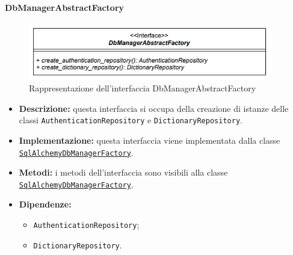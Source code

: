 \paragraph{DbManagerAbstractFactory} \label{DbManagerAbstractFactory}
\begin{figure}[H]
    \centering
    \includegraphics[width=0.95\textwidth]{assets/Backend/db_manager_abstract_factory.png}
    \caption{Rappresentazione dell'interfaccia DbManagerAbstractFactory}
  \end{figure}
\begin{itemize}
    \item \textbf{Descrizione:} questa interfaccia si occupa della creazione di istanze delle classi \texttt{AuthenticationRepository} e \texttt{DictionaryRepository}.
    \item \textbf{Implementazione:} questa interfaccia viene implementata dalla classe \hyperref[SqlAlchemyDbManagerFactory]{\texttt{SqlAlchemyDbManagerFactory}}.
    \item \textbf{Metodi:} i metodi dell'interfaccia sono visibili alla classe \hyperref[SqlAlchemyDbManagerFactory]{\texttt{SqlAlchemyDbManagerFactory}}.
    \item \textbf{Dipendenze:}
    \begin{itemize}
        \item \texttt{AuthenticationRepository};
        \item \texttt{DictionaryRepository}.
    \end{itemize}
\end{itemize} 

